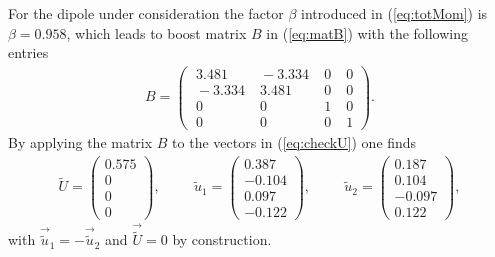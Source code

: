 \documentclass[11pt,a4paper]{article}
\begin{document}
For the dipole under consideration the factor $\beta$ introduced in (\ref{eq:totMom}) is $\beta = 0.958$, which leads to boost matrix $B$ in (\ref{eq:matB}) with the following entries
\begin{align}
B =  \left(
\begin{array}{cccc}
\; 3.481&\; -3.334 &\;0 &\; 0\\
\; -3.334 &\;  3.481 &\; 0  &\; 0  \\
\; 0 &\; 0  &\; 1 &\; 0 \\
\; 0&\; 0&\; 0 &\; 1
\end{array}
\right).
\end{align}
By applying the matrix $B$ to the vectors in (\ref{eq:checkU})
one finds
\begin{align} \label{eq:tildeU}
\tilde{ U }=\left(\begin{matrix} 0.575\\0\\ 0\\0\end{matrix}\right),\hspace{1cm}\tilde{ u }_1=\left(\begin{matrix} 0.387\\-0.104\\ 0.097\\-0.122\end{matrix}\right),\hspace{1cm}\tilde{ u }_2=\left(\begin{matrix} 0.187\\0.104\\ -0.097\\0.122\end{matrix}\right) ,
\end{align}
with $\vec{\tilde{u}}_1=-\vec{\tilde{u}}_2$ and $\vec{\tilde{ U}}=0$ by construction.
\end{document}
